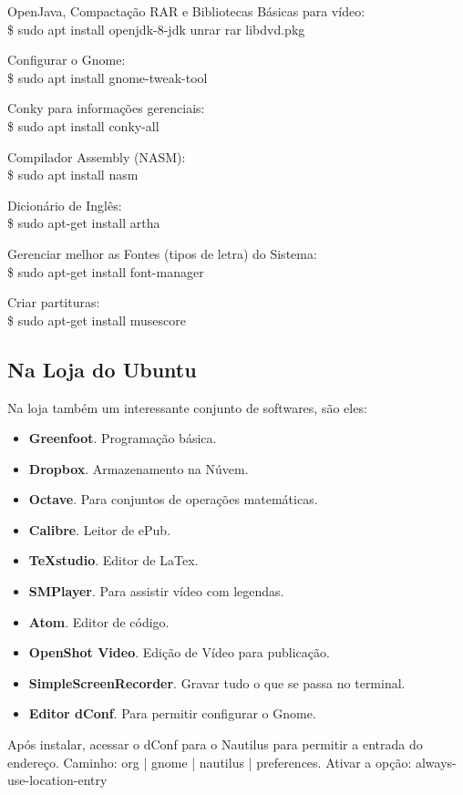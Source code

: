 \documentclass[a4paper,11pt]{article}
\begin{document}
OpenJava, Compactação RAR e Bibliotecas Básicas para vídeo: \\
{\ttfamily\$ sudo apt install openjdk-8-jdk unrar rar libdvd.pkg}

Configurar o Gnome: \\
{\ttfamily\$ sudo apt install gnome-tweak-tool}

Conky para informações gerenciais: \\
{\ttfamily\$ sudo apt install conky-all}

Compilador Assembly (NASM): \\
{\ttfamily\$ sudo apt install nasm}

Dicionário de Inglês: \\
{\ttfamily\$ sudo apt-get install artha}

Gerenciar melhor as Fontes (tipos de letra) do Sistema: \\
{\ttfamily\$ sudo apt-get install font-manager}

Criar partituras: \\
{\ttfamily\$ sudo apt-get install musescore}

\subsection{Na Loja do Ubuntu}
Na loja também um interessante conjunto de softwares, são eles: \vspace{-1em}
\begin{itemize}
  \item \textbf{Greenfoot}. Programação básica.
  \item \textbf{Dropbox}. Armazenamento na Núvem.
  \item \textbf{Octave}. Para conjuntos de operações matemáticas.
  \item \textbf{Calibre}. Leitor de ePub.
  \item \textbf{TeXstudio}. Editor de LaTex.
  \item \textbf{SMPlayer}. Para assistir vídeo com legendas.
  \item \textbf{Atom}. Editor de código.
  \item \textbf{OpenShot Video}. Edição de Vídeo para publicação.
  \item \textbf{SimpleScreenRecorder}. Gravar tudo o que se passa no terminal.
  \item \textbf{Editor dConf}. Para permitir configurar o Gnome.
\end{itemize}

Após instalar, acessar o dConf para o Nautilus para permitir a entrada do endereço. Caminho: org | gnome | nautilus | preferences. Ativar a opção: {\ttfamily always-use-location-entry}
\end{document}
